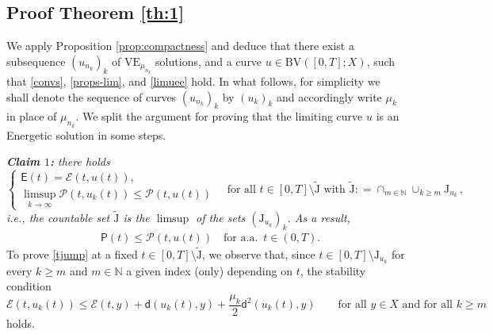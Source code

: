 \documentclass[a4paper,10pt,reqno]{amsart} %
\newcommand{\N}{\mathbb{N}}
\numberwithin{equation}{section}
\newcommand{\foraa}{\text{for a.a.\ }}
\newcommand{\Xs}{X}
\newcommand{\BV}{\mathrm{BV}}
\newcommand{\mdn}{\mathsf{d}}
\newcommand{\md}[2]{\mathsf{d}(#1,#2)}
\newcommand{\ene}[2]{\mathcal{E}(#1,#2)}
\newcommand{\pw}[2]{\mathcal{P}(#1,#2)}
\newcommand{\jump}[1]{\mathrm{J}_{#1}}
\newcommand{\tjump}{\widetilde{\mathrm{J}}}
\newcommand{\VEa}[1]{\mathrm{VE}_{#1}}
\newcommand{\rstab}[2]{\mathcal{R}(#1,#2)}
\newcommand{\limE}{\mathsf{E}}
\newcommand{\limP}{\mathsf{P}}
\newcommand{\RRR}{\color{red}}
\begin{document}
\subsection{Proof Theorem \ref{th:1}}
\label{ss:3.1}
We apply Proposition \ref{prop:compactness} and deduce that there exist a subsequence $(u_{n_k})_k $ of   $\VEa{\mu_{n_k}}$   solutions, and a curve $u\in  \BV([0,T];\Xs)$, such that \eqref{convs}, \eqref{props-lim}, and \eqref{limuee} hold.
 In what follows, 
for simplicity we shall denote the sequence of curves $(u_{n_k})_k$
 by $(u_k)_k$  and accordingly write $\mu_k$ in place of $\mu_{n_k}$. 
We split the argument for proving that  the limiting curve  $u$ is an Energetic solution  in some steps.
\par
\emph{\textbf{Claim $1$:} there holds} %
\begin{equation}
\label{tjump}
\begin{cases}
\limE(t) = \ene{t}{u(t)}, \\ \limsup_{k\to\infty} \pw t{u_{k}(t)} \leq \pw t{u(t)} 
\end{cases}
\quad \text{for all } t \in [0,T]\setminus \tjump  \text{ with  } 
\tjump: =\cap_{m\in \N} \cup_{k \geq m} \jump{u_{k}}\,,
\end{equation}
\emph{i.e., the countable set $\tjump$ is  the $\limsup$ of the sets $( \jump{u_{k}})_k$. 
As a result,}
\begin{align}
\label{limp_pw}
&
\limP(t) \leq \pw t{u(t)} \quad \foraa\, t \in (0,T).
\end{align}
To prove \eqref{tjump} at a fixed  $t\in  [0,T]\setminus \tjump$, we observe that, since 
$t\in [0,T]\setminus \jump{u_{k}}$ for every $k\geq m$ and $m \in \N$ a given index (only) depending on $t$, the stability condition
\begin{equation}
\label{stab-k-t}
\ene t{u_{k}(t)} \leq \ene ty + \md {u_{k}(t)}y + \frac{\mu_{k}}2 \mdn^2  (u_{k}(t),y) \qquad  \text{for all } y \in \Xs  \text{ and for all } k \geq m
\end{equation}
holds.
\end{document}
